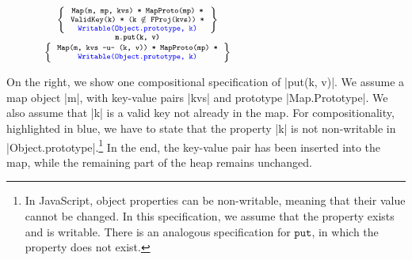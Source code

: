 \begin{figure}
\vspace*{-0.3cm}
\hspace*{-0.8cm}
$
{\scriptsize
\begin{array}{c}
\left\{ {\begin{array}{c}
 \text{\texttt{Map(m, mp, kvs) * MapProto(mp) *}} \\
 \text{\texttt{ValidKey(k) * (k $\notin$ FProj(kvs)) *}} \\
 \text{\textcolor{blue}{\texttt{Writable(Object.prototype, k)}}}
\end{array}} \right\} \\
%
\text{\bfseries \texttt{m.put(k, v)}} \\[0.2mm]
%
\left\{ {\begin{array}{c}
 \text{\texttt{Map(m, kvs -u- (k, v)) * MapProto(mp) *}} \\
 \text{\textcolor{blue}{\texttt{Writable(Object.prototype, k)}}} \\
\end{array}} \right\}
\end{array}
} 
$
\vspace*{-0.4cm}
\end{figure}

On the right, we show one compositional specification of \jsinline|put(k, v)|. 
We assume a map object \jsinline|m|, with key-value pairs \jsinline|kvs| and prototype \jsinline|Map.Prototype|. We also assume that \jsinline|k| is a valid key not already in the map. For compositionality, highlighted in blue, we have to state that the property \jsinline|k| is not non-writable in \jsinline|Object.prototype|.\footnote{In JavaScript, object properties can be non-writable, meaning that their value cannot be changed. In this specification, we assume that the property exists and is writable. There is an analogous specification for $\mathtt{put}$, in which the property does not exist.}
In the end, the key-value pair has been inserted into the map, while the remaining part of the heap remains unchanged.


